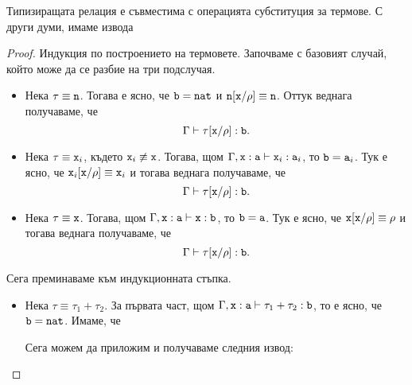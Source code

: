 \begin{important}
  \begin{lemma}
    Типизиращата релация е съвместима с операцията субституция за термове.
    С други думи, имаме извода
    \begin{prooftree}
    \end{prooftree}
  \end{lemma}
\end{important}
\begin{proof}
  Индукция по построението на термовете.
  Започваме с базовият случай, който може да се разбие на три подслучая.
  \begin{itemize}
  \item
    Нека $\tau \equiv \vv{n}$.
    Тогава е ясно, че $\vv{b} = \nat$ и $\vv{n}\subst{x}{\rho} \equiv \vv{n}$.
    Оттук веднага получаваме, че
    \[\Gamma \vdash \tau\subst{x}{\rho} : \vv{b}.\]
  \item
    Нека $\tau \equiv \vv{x}_i$, където $\vv{x}_i \not\equiv \vv{x}$.
    Тогава, щом $\Gamma,\type{x}{a} \vdash \vv{x}_i:\vv{a}_i$, то $\vv{b} = \vv{a}_i$.
    Тук е ясно, че $\vv{x}_i\subst{x}{\rho} \equiv \vv{x}_i$ и тогава веднага получаваме, че
    \[\Gamma \vdash \tau\subst{x}{\rho} : \vv{b}.\]
  \item
    Нека $\tau \equiv \vv{x}$. Тогава, щом $\Gamma, \type{x}{a} \vdash \type{x}{b}$, то $\vv{b} = \vv{a}$.
    Тук е ясно, че $\vv{x}\subst{x}{\rho} \equiv \rho$ и тогава веднага получаваме, че
    \[\Gamma \vdash \tau\subst{x}{\rho} : \vv{b}.\]
  \end{itemize}
    Сега преминаваме към индукционната стъпка.
  \begin{itemize}
  \item
    Нека $\tau \equiv \tau_1 + \tau_2$.
    За първата част, щом $\Gamma,\type{x}{a} \vdash \tau_1+\tau_2 : \vv{b}$, то
    е ясно, че $\vv{b} = \vv{nat}$. Имаме, че
    \begin{prooftree}
    \end{prooftree}
    Сега можем да приложим \IndHyp и получаваме следния извод:
    \begin{prooftree}

\end{prooftree}
\end{itemize}
\end{proof}
